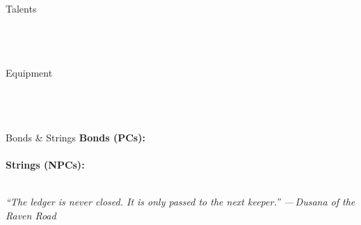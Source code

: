 \documentclass[10pt]{article}
\begin{document}
\begin{minipage}[t]{0.48\linewidth}
    \begin{charbox}{Talents}
        \underline{\hspace{7cm}}\\
        \underline{\hspace{7cm}}\\
        \underline{\hspace{7cm}}\\
        \underline{\hspace{7cm}}\\
        \underline{\hspace{7cm}}
    \end{charbox}
    
    \vspace{0.5em}
    
    \begin{charbox}{Equipment}
        \underline{\hspace{7cm}}\\
        \underline{\hspace{7cm}}\\
        \underline{\hspace{7cm}}\\
        \underline{\hspace{7cm}}\\
        \underline{\hspace{7cm}}
    \end{charbox}
    
    \vspace{0.5em}
    
    \begin{charbox}{Bonds \& Strings}
        \textbf{Bonds (PCs):}\\
        \underline{\hspace{7cm}}\\
        \textbf{Strings (NPCs):}\\
        \underline{\hspace{7cm}}\\
        \underline{\hspace{7cm}}
    \end{charbox}
\end{minipage}

\vspace{0.5em}
\begin{center}
    {\small\sffamily\itshape ``The ledger is never closed. It is only passed to the next keeper.'' --- Dusana of the Raven Road}
\end{center}
\newpage
\end{document}
